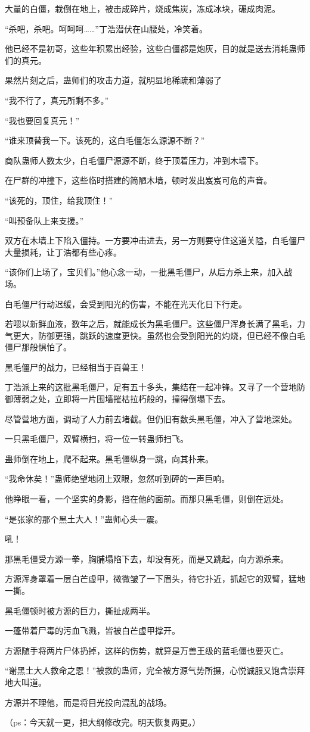 \begin{this_body}
大量的白僵，栽倒在地上，被击成碎片，烧成焦炭，冻成冰块，碾成肉泥。

“杀吧，杀吧。呵呵呵……”丁浩潜伏在山腰处，冷笑着。

他已经不是初哥，这些年积累出经验，这些白僵都是炮灰，目的就是送去消耗蛊师们的真元。

果然片刻之后，蛊师们的攻击力道，就明显地稀疏和薄弱了

“我不行了，真元所剩不多。”

“我也要回复真元！”

“谁来顶替我一下。该死的，这白毛僵怎么源源不断？”

商队蛊师人数太少，白毛僵尸源源不断，终于顶着压力，冲到木墙下。

在尸群的冲撞下，这些临时搭建的简陋木墙，顿时发出岌岌可危的声音。

“该死的，顶住，给我顶住！”

“叫预备队上来支援。”

双方在木墙上下陷入僵持。一方要冲击进去，另一方则要守住这道关隘，白毛僵尸大量损耗，让丁浩都有些心疼。

“该你们上场了，宝贝们。”他心念一动，一批黑毛僵尸，从后方杀上来，加入战场。

白毛僵尸行动迟缓，会受到阳光的伤害，不能在光天化日下行走。

若喂以新鲜血液，数年之后，就能成长为黑毛僵尸。这些僵尸浑身长满了黑毛，力气更大，防御更强，跳跃的速度更快。虽然也会受到阳光的灼烧，但已经不像白毛僵尸那般惧怕了。

黑毛僵尸的战力，已经相当于百兽王！

丁浩派上来的这批黑毛僵尸，足有五十多头，集结在一起冲锋。又寻了一个营地防御薄弱之处，立即将一片围墙摧枯拉朽般的，撞得倒塌下去。

尽管营地方面，调动了人力前去堵截。但仍旧有数头黑毛僵，冲入了营地深处。

一只黑毛僵尸，双臂横扫，将一位一转蛊师扫飞。

蛊师倒在地上，爬不起来。黑毛僵纵身一跳，向其扑来。

“我命休矣！”蛊师绝望地闭上双眼，忽然听到砰的一声巨响。

他睁眼一看，一个坚实的身影，挡在他的面前。而那只黑毛僵，则倒在远处。

“是张家的那个黑土大人！”蛊师心头一震。

吼！

那黑毛僵受方源一拳，胸脯塌陷下去，却没有死，而是又跳起，向方源杀来。

方源浑身罩着一层白芒虚甲，微微皱了一下眉头，待它扑近，抓起它的双臂，猛地一撕。

黑毛僵顿时被方源的巨力，撕扯成两半。

一蓬带着尸毒的污血飞溅，皆被白芒虚甲撑开。

方源随手将两片尸体扔掉，这样的伤势，就算是万兽王级的蓝毛僵也要灭亡。

“谢黑土大人救命之恩！”被救的蛊师，完全被方源气势所摄，心悦诚服又饱含崇拜地大叫道。

方源并不理他，而是将目光投向混乱的战场。

（ps：今天就一更，把大纲修改完。明天恢复两更。）

\end{this_body}

